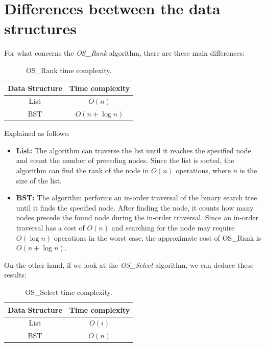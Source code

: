 \documentclass[11pt]{article}
\begin{document}
\section{Differences beetween the data structures}
For what concerns the \textit{OS\_Rank} algorithm, there are these main differences:
\begin{table}[H]
                \centering
                \begin{tabular}{|c|c|}
                    \hline
                    \textbf{Data Structure} & \textbf{Time complexity} \\
                    \hline
                    List & {$O(n)$} \\
                    \hline
                    BST & {$O(n + \log n)$} \\
                    \hline
                    \end{tabular}
                \caption{OS\_Rank time complexity.}
\end{table}
Explained as follows:
\begin{itemize}
    \item \textbf{List:} The algorithm can traverse the list until it reaches the specified node and count the number of preceding nodes. Since the list is sorted, the algorithm can find the rank of the node in $O(n)$ operations, where $n$ is the size of the list.
    \item \textbf{BST:} The algorithm performs an in-order traversal of the binary search tree until it finds the specified node. After finding the node, it counts how many nodes precede the found node during the in-order traversal. Since an in-order traversal has a cost of $O(n)$ and searching for the node may require $O(\log n)$ operations in the worst case, the approximate cost of OS\_Rank is $O(n + \log n)$.
\end{itemize}
On the other hand, if we look at the \textit{OS\_Select} algorithm, we can deduce these results:
\begin{table}[H]
                \centering
                \begin{tabular}{|c|c|}
                    \hline
                    \textbf{Data Structure} & \textbf{Time complexity} \\
                    \hline
                    List & {$O(i)$} \\
                    \hline
                    BST & {$O(n)$} \\
                    \hline
                    \end{tabular}
                \caption{OS\_Select time complexity.}
\end{table}
\end{document}
